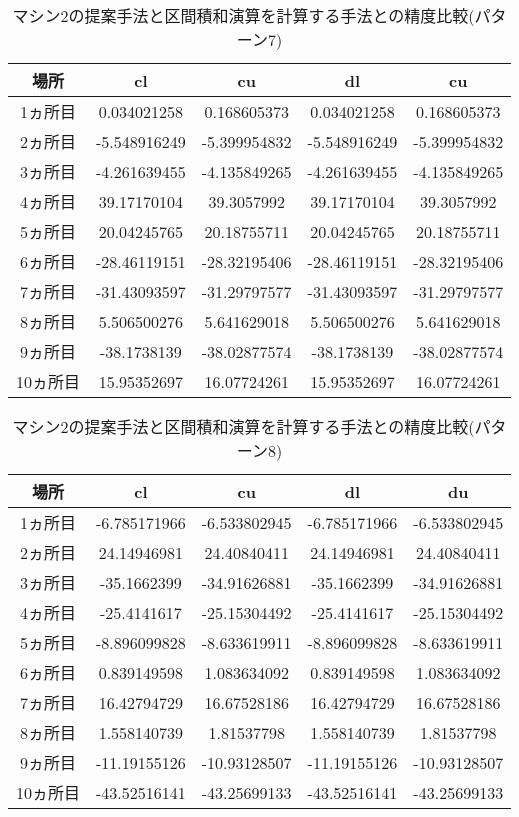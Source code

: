 \documentclass[11pt,a4paper]{jsreport}
\theoremstyle{definition}
\begin{document}
\begin{table}[H]
\centering
\begin{tabular}{|c|c|c|c|c|}
\hline
場所 & cl & cu & dl & cu \\ \hline
1ヵ所目 & 0.034021258 & 0.168605373 & 0.034021258 & 0.168605373 \\ \hline
2ヵ所目 & -5.548916249 & -5.399954832 & -5.548916249 & -5.399954832 \\ \hline
3ヵ所目 & -4.261639455 & -4.135849265 & -4.261639455 & -4.135849265 \\ \hline
4ヵ所目 & 39.17170104 & 39.3057992 & 39.17170104 & 39.3057992 \\ \hline
5ヵ所目 & 20.04245765 & 20.18755711 & 20.04245765 & 20.18755711 \\ \hline
6ヵ所目 & -28.46119151 & -28.32195406 & -28.46119151 & -28.32195406 \\ \hline
7ヵ所目 & -31.43093597 & -31.29797577 & -31.43093597 & -31.29797577 \\ \hline
8ヵ所目 & 5.506500276 & 5.641629018 & 5.506500276 & 5.641629018 \\ \hline
9ヵ所目 & -38.1738139 & -38.02877574 & -38.1738139 & -38.02877574 \\ \hline
10ヵ所目 & 15.95352697 & 16.07724261 & 15.95352697 & 16.07724261 \\ \hline
\end{tabular}
\caption{マシン2の提案手法と区間積和演算を計算する手法との精度比較(パターン7)}
\end{table}

\begin{table}[H]
\centering
\begin{tabular}{|c|c|c|c|c|}
\hline
場所 & cl & cu & dl & du \\ \hline
1ヵ所目 & -6.785171966 & -6.533802945 & -6.785171966 & -6.533802945 \\ \hline
2ヵ所目 & 24.14946981 & 24.40840411 & 24.14946981 & 24.40840411 \\ \hline
3ヵ所目 & -35.1662399 & -34.91626881 & -35.1662399 & -34.91626881 \\ \hline
4ヵ所目 & -25.4141617 & -25.15304492 & -25.4141617 & -25.15304492 \\ \hline
5ヵ所目 & -8.896099828 & -8.633619911 & -8.896099828 & -8.633619911 \\ \hline
6ヵ所目 & 0.839149598 & 1.083634092 & 0.839149598 & 1.083634092 \\ \hline
7ヵ所目 & 16.42794729 & 16.67528186 & 16.42794729 & 16.67528186 \\ \hline
8ヵ所目 & 1.558140739 & 1.81537798 & 1.558140739 & 1.81537798 \\ \hline
9ヵ所目 & -11.19155126 & -10.93128507 & -11.19155126 & -10.93128507 \\ \hline
10ヵ所目 & -43.52516141 & -43.25699133 & -43.52516141 & -43.25699133 \\ \hline
\end{tabular}
\caption{マシン2の提案手法と区間積和演算を計算する手法との精度比較(パターン8)}
\end{table}
\end{document}
